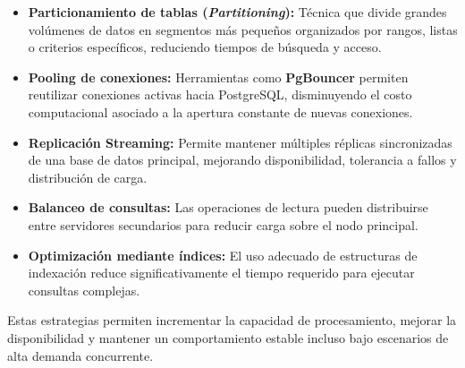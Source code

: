 \begin{itemize}

\item \textbf{Particionamiento de tablas (\textit{Partitioning}):} Técnica que divide grandes volúmenes de datos en segmentos más pequeños organizados por rangos, listas o criterios específicos, reduciendo tiempos de búsqueda y acceso.

\item \textbf{Pooling de conexiones:} Herramientas como \textbf{PgBouncer} permiten reutilizar conexiones activas hacia PostgreSQL, disminuyendo el costo computacional asociado a la apertura constante de nuevas conexiones.

\item \textbf{Replicación Streaming:} Permite mantener múltiples réplicas sincronizadas de una base de datos principal, mejorando disponibilidad, tolerancia a fallos y distribución de carga.

\item \textbf{Balanceo de consultas:} Las operaciones de lectura pueden distribuirse entre servidores secundarios para reducir carga sobre el nodo principal.

\item \textbf{Optimización mediante índices:} El uso adecuado de estructuras de indexación reduce significativamente el tiempo requerido para ejecutar consultas complejas.
\end{itemize}

Estas estrategias permiten incrementar la capacidad de procesamiento, mejorar la disponibilidad y mantener un comportamiento estable incluso bajo escenarios de alta demanda concurrente.